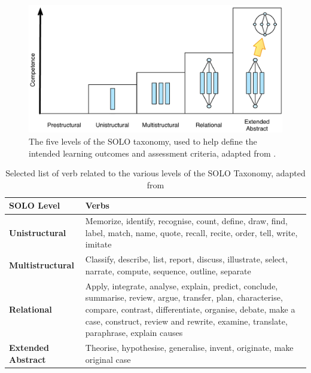 \begin{figure}[htbp]
	\centering
	\includegraphics[width=\textwidth]{SOLO}
	\caption{The five levels of the SOLO taxonomy, used to help define the intended learning outcomes and assessment criteria, adapted from \citet{Biggs:2007}.}
	\label{fig:solo}
\end{figure}

\begin{table}
	\renewcommand{\arraystretch}{1.6}
	\centering
	\caption{Selected list of verb related to the various levels of the SOLO Taxonomy, adapted from \citet{Biggs:2007}}
 	\label{tbl:solo_verbs}

    \begin{tabular}{lp{10cm}}
    SOLO Level        & Verbs \\
    \hline
    \textbf{Unistructural}     & Memorize, identify, recognise, count, define, draw, find, label, match, name, quote, recall, recite, order, tell, write, imitate\\
    \textbf{Multistructural}   & Classify, describe, list, report, discuss, illustrate, select, narrate, compute, sequence, outline, separate\\
    \textbf{Relational}        & Apply, integrate, analyse, explain, predict, conclude, summarise, review, argue, transfer, plan, characterise, compare, contrast, differentiate, organise, debate, make a case, construct, review and rewrite, examine, translate, paraphrase, explain causes \\
    \textbf{Extended Abstract} & Theorise, hypothesise, generalise, invent, originate, make original case\\
    \end{tabular}
\end{table}

